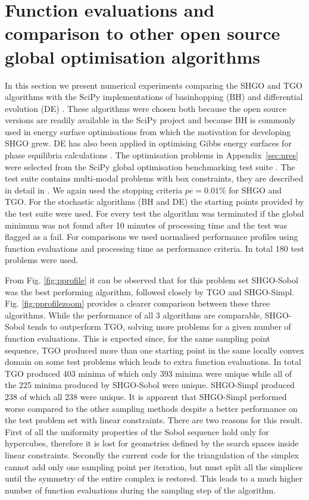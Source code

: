 \section{Function evaluations and comparison to other open source global optimisation algorithms}
In this section we present numerical experiments comparing the SHGO and TGO algorithms with the SciPy implementations \cite{scipy} of basinhopping (BH) \cite{li1987monte, wales2003energy, wales1997global, wales1999global} and differential evolution (DE) \cite{Storn1997}. These algorithms were chosen both because the open source versions are readily available in the SciPy project and because BH is commonly used in energy surface optimisations \cite{Wales2015} from which the motivation for developing SHGO grew. DE has also been applied in optimising Gibbs energy surfaces for phase equilibria calculations \cite{Zhang2011}. The optimisation problems in Appendix~\ref{sec:nres} were selected from the SciPy global optimisation benchmarking test suite \citep{Adorio2005, Gavana2016, Jamil2013, Mishra2007, Mishra2006, NIST2016}. The test suite contains multi-modal problems with box constraints, they are described in detail in \cite{Gavana2016}. We again used the stopping criteria $pe = 0.01\%$ for SHGO and TGO. For the stochastic algorithms (BH and DE) the starting points provided by the test suite were used. For every test the algorithm was terminated if the global minimum was not found after 10 minutes of processing time and the test was flagged as a fail. For comparisons we used normalised performance profiles \cite{Dolan2002} using function evaluations and processing time as performance criteria. In total 180 test problems were used.

From Fig. \ref{fig:pprofile} it can be observed that for this problem set SHGO-Sobol was the best performing algorithm, followed closely by TGO and SHGO-Simpl. Fig. \ref{fig:pprofilezoom} provides a clearer comparison between these three algorithms. While the performance of all 3 algorithms are comparable, SHGO-Sobol tends to outperform TGO, solving more problems for a given number of function evaluations. This is expected since, for the same sampling point sequence, TGO produced more than one starting point in the same locally convex domain on some test problems which leads to extra function evaluations. In total TGO produced 403 minima of which only 393 minima were unique while all of the 225 minima produced by SHGO-Sobol were unique. SHGO-Simpl produced 238 of which all 238 were unique. It is apparent that SHGO-Simpl performed worse compared to the other sampling methods despite a better performance on the test problem set with linear constraints. There are two reasons for this result. First of all the uniformity properties of the Sobol sequence hold only for hypercubes, therefore it is lost for geometries defined by the search spaces inside linear constraints. Secondly the current code for the triangulation of the simplex cannot add only one sampling point per iteration, but must split all the simplices until the symmetry of the entire complex is restored. This leads to a much higher number of function evaluations during the sampling step of the algorithm.

